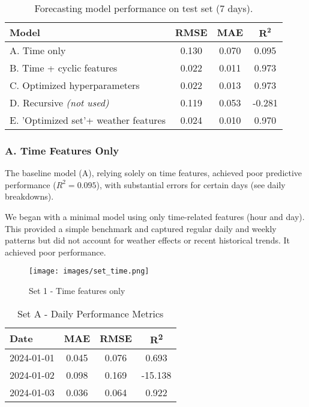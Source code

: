 \begin{table}[h!]
    \centering
    \begin{tabular}{lccc}
        \textbf{Model} & \textbf{RMSE} & \textbf{MAE} & $\mathbf{R^2}$ \\
        \hline
        A. Time only & 0.130 & 0.070 & 0.095 \\
        B. Time + cyclic features & 0.022 & 0.011 & 0.973 \\
        C. Optimized hyperparameters & 0.022 & 0.013 & 0.973 \\
        D. Recursive \textit{(not used)} & 0.119 & 0.053 & -0.281 \\
        E. 'Optimized set'+ weather features & 0.024 & 0.010 & 0.970 \\
    \end{tabular}
    \caption{Forecasting model performance on test set (7 days).}
    \label{tab:forecast-metrics}
\end{table}

\subsubsection*{A. Time Features Only}
The baseline model (A), relying solely on time features, achieved poor predictive performance ($R^2=0.095$), 
with substantial errors for certain days (see daily breakdowns). 

We began with a minimal model using only time-related features (hour and day). This 
provided a simple benchmark and captured regular daily and weekly patterns but did not 
account for weather effects or recent historical trends. It achieved poor performance. 

\begin{figure}[H]
    \centering
    \texttt{[image: images/set\_time.png]}
    \caption{Set 1 - Time features only}
    \label{fig:set1-forecast-profile}
\end{figure}

\begin{table}[H]
    \centering
    \begin{tabular}{lccc}
        Date        & MAE    & RMSE   & R\textsuperscript{2} \\
        \hline
        2024-01-01  & 0.045  & 0.076  & 0.693 \\
        2024-01-02  & 0.098  & 0.169  & -15.138 \\
        2024-01-03  & 0.036  & 0.064  & 0.922 \\
    \end{tabular}
    \caption{Set A - Daily Performance Metrics}
\end{table}

